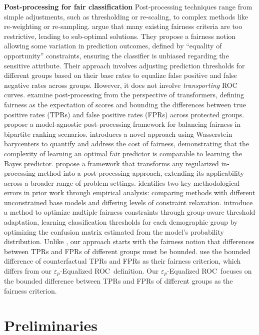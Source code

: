 \documentclass{article}
\newcommand{\ourdef}{-Equalized ROC}
\begin{document}
\noindent \textbf{Post-processing for fair classification}
Post-processing techniques range from simple adjustments, such as thresholding or re-scaling, to complex methods like re-weighting or re-sampling. \cite{hardt16} argue that many existing fairness criteria are too restrictive, leading to sub-optimal solutions. They propose a fairness notion allowing some variation in prediction outcomes, defined by ``equality of opportunity'' constraints, ensuring the classifier is unbiased regarding the sensitive attribute. Their approach involves adjusting prediction thresholds for different groups based on their base rates to equalize false positive and false negative rates across groups. However, it does not involve \textit{transporting} ROC curves.
\cite{wei20} examine post-processing from the perspective of transformers, defining fairness as the expectation of scores and bounding the differences between true positive rates (TPRs) and false positive rates (FPRs) across protected groups. \cite{cui2021} propose a model-agnostic post-processing framework for balancing fairness in bipartite ranking scenarios.
\cite{zhao2024fair} introduces a novel approach using Wasserstein barycenters to quantify and address the cost of fairness, demonstrating that the complexity of learning an optimal fair predictor is comparable to learning the Bayes predictor.
\cite{tifreafrappe} propose a framework that transforms any regularized in-processing method into a post-processing approach, extending its applicability across a broader range of problem settings. 
\cite{cruz2023unprocessing} identifies two key methodological errors in prior work through empirical analysis: comparing methods with different unconstrained base models and differing levels of constraint relaxation.
\cite{jang22} introduce a method to optimize multiple fairness constraints through group-aware threshold adaptation, learning classification thresholds for each demographic group by optimizing the confusion matrix estimated from the model's probability distribution. Unlike \cite{jang22}, our approach starts with the fairness notion that differences between TPRs and FPRs of different groups must be bounded.
\cite{mishler2021fairness} use the bounded difference of counterfactual TPRs and FPRs as their fairness criterion, which differs from our $\varepsilon_p$\ourdef\ definition. Our $\varepsilon_p$\ourdef\ focuses on the bounded difference between TPRs and FPRs of different groups as the fairness criterion.


\section{Preliminaries}
\label{sec:prelim}
\end{document}
